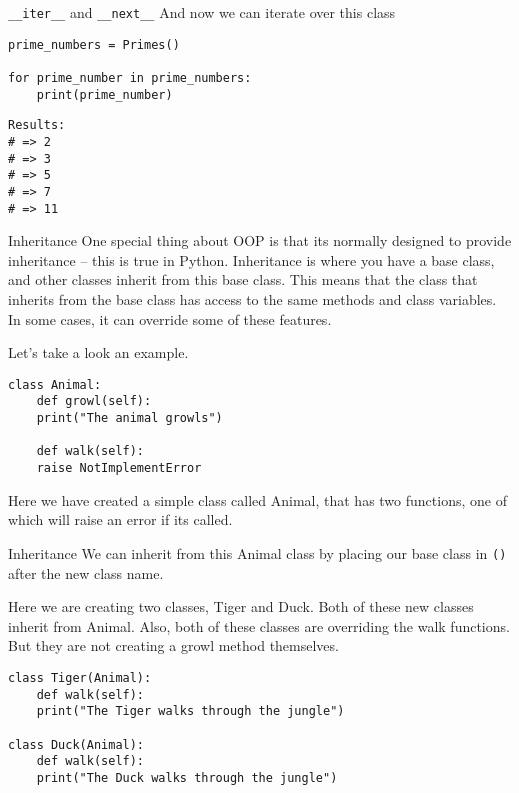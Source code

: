 \documentclass[10pt]{beamer}
\begin{document}
\begin{frame}[label={sec:org4e17a9b},fragile]{\texttt{\_\_iter\_\_} and \texttt{\_\_next\_\_}}
 And now we can iterate over this class

\begin{verbatim}
prime_numbers = Primes()

for prime_number in prime_numbers:
    print(prime_number)
\end{verbatim}

\begin{verbatim}
Results: 
# => 2
# => 3
# => 5
# => 7
# => 11
\end{verbatim}
\end{frame}

\begin{frame}[label={sec:org7eba47b},fragile]{Inheritance}
 One special thing about OOP is that its normally designed to provide inheritance --
this is true in Python. Inheritance is where you have a base class, and other classes
inherit from this base class. This means that the class that inherits from the base
class has access to the same methods and class variables. In some cases, it can
override some of these features.

Let's take a look an example.

\begin{verbatim}
class Animal:
    def growl(self):
	print("The animal growls")

    def walk(self):
	raise NotImplementError
\end{verbatim}

Here we have created a simple class called Animal, that has two functions, one of
which will raise an error if its called.
\end{frame}

\begin{frame}[label={sec:orgbe1540f},fragile]{Inheritance}
 We can inherit from this Animal class by placing our base class in \texttt{()} after the new
class name.

Here we are creating two classes, Tiger and Duck. Both of these new classes inherit
from Animal. Also, both of these classes are overriding the walk functions. But they
are not creating a growl method themselves.

\begin{verbatim}
class Tiger(Animal):
    def walk(self):
	print("The Tiger walks through the jungle")

class Duck(Animal):
    def walk(self):
	print("The Duck walks through the jungle")
\end{verbatim}
\end{frame}
\end{document}
